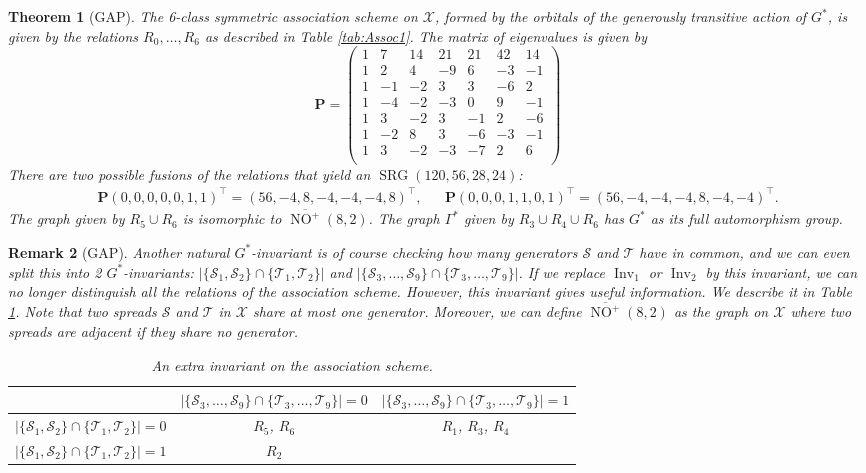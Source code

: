 \documentclass[10pt,a4paper]{amsart}
\newtheorem{thm}{Theorem}[section]
\newtheorem{rmk}[thm]{Remark}
\newcommand{\ms}{\mathcal S}
\newcommand{\mt}{\mathcal T}
\newcommand{\mx}{\mathcal X}
\DeclareMathOperator{\NO}{NO}
\newcommand{\nono}{\overline{\NO^+}(8,2)}
\newcommand{\BP}{\boldsymbol P}
\DeclareMathOperator{\SRG}{SRG}
\DeclareMathOperator{\Inv}{Inv}
\begin{document}
\begin{thm}[GAP]
 \label{Thm:Assoc:Spreads}
 The 6-class symmetric association scheme on $\mx$, formed by the orbitals of the generously transitive action of $G^*$, is given by the relations $R_0, \dots, R_6$ as described in Table \ref{tab:Assoc1}.
 The matrix of eigenvalues is given by
 \[
  \BP = \begin{pmatrix}
1 & 7 & 14 & 21 & 21 & 42 & 14\\
1 & 2 & 4 & -9 & 6 & -3 & -1\\
1 & -1 & -2 & 3 & 3 & -6 & 2\\
1 & -4 & -2 & -3 & 0 & 9 & -1\\
1 & 3 & -2 & 3 & -1 & 2 & -6\\
1 & -2 & 8 & 3 & -6 & -3 & -1\\
1 & 3 & -2 & -3 & -7 & 2 & 6\\
\end{pmatrix}
 \]
 There are two possible fusions of the relations that yield an $\SRG(120,56,28,24)$:
\begin{align*}
 \BP (0,0,0,0,0,1,1)^\top
 = (56,-4,8,-4,-4,-4,8)^\top, &&
 \BP (0,0,0,1,1,0,1)^\top
 = (56,-4,-4,-4,8,-4,-4)^\top.
\end{align*}
 The graph given by $R_5 \cup R_6$ is isomorphic to $\nono$.
 The graph $\Gamma^*$ given by $R_3 \cup R_4 \cup R_6$ has $G^*$ as its full automorphism group.
\end{thm}



\begin{rmk}[GAP]
 \label{Rmk:extra invariant}
Another natural $G^*$-invariant is of course checking how many generators $\ms$ and $\mt$ have in common, and we can even split this into 2 $G^*$-invariants: $|\{\ms_1, \ms_2\} \cap \{\mt_1, \mt_2\}|$ and $|\{\ms_3, \dots, \ms_9\} \cap \{\mt_3, \dots, \mt_9\}|$.
If we replace $\Inv_1$ or $\Inv_2$ by this invariant, we can no longer distinguish all the relations of the association scheme.
However, this invariant gives useful information.
We describe it in Table \ref{tab:extra invariant}.
 Note that two spreads $\ms$ and $\mt$ in $\mx$ share at most one generator.
 Moreover, we can define $\nono$ as the graph on $\mx$ where two spreads are adjacent if they share no generator.

\begin{table}[h!]
 \centering
 \begin{tabular}{|c||c|c|}
 \hline
 & $|\{\ms_3, \dots, \ms_9\} \cap \{\mt_3, \dots, \mt_9\}| = 0$ & $|\{\ms_3, \dots, \ms_9\} \cap \{\mt_3, \dots, \mt_9\}| = 1$ \\ \hline \hline
 $|\{\ms_1, \ms_2\} \cap \{\mt_1, \mt_2\}| = 0$ & $R_5$, $R_6$ & $R_1$, $R_3$, $R_4$ \\ \hline
 $|\{\ms_1, \ms_2\} \cap \{\mt_1, \mt_2\}| = 1$ & $R_2$ & \\ \hline
 \end{tabular}
 \caption{An extra invariant on the association scheme.}
 \label{tab:extra invariant}
\end{table}
\end{rmk}
\end{document}
